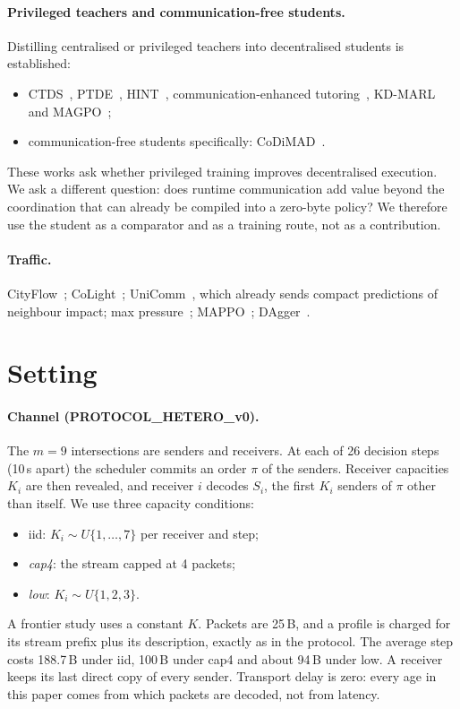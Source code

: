 \documentclass[11pt]{article}
\theoremstyle{definition}
\begin{document}
\paragraph{Privileged teachers and communication-free students.} Distilling centralised or privileged teachers into
decentralised students is established:
\begin{itemize}
\item CTDS~\cite{ctds}, PTDE~\cite{ptde}, HINT~\cite{hint}, communication-enhanced tutoring~\cite{tutoring},
KD-MARL~\cite{kdmarl} and MAGPO~\cite{magpo};
\item communication-free students specifically: CoDiMAD~\cite{codimad}.
\end{itemize}
These works ask whether privileged training improves decentralised execution. We ask a different question: does
runtime communication add value beyond the coordination that can already be compiled into a zero-byte policy? We
therefore use the student as a comparator and as a training route, not as a contribution.
\paragraph{Traffic.} CityFlow~\cite{cityflow}; CoLight~\cite{colight}; UniComm~\cite{unicomm}, which already sends
compact predictions of neighbour impact; max pressure~\cite{varaiya2013}; MAPPO~\cite{mappo}; DAgger~\cite{dagger}.

\section{Setting}\label{sec:setting}
\paragraph{Channel (PROTOCOL\_HETERO\_v0).} The $m=9$ intersections are senders and receivers. At each of 26 decision
steps (10\,s apart) the scheduler commits an order $\pi$ of the senders. Receiver capacities $K_i$ are then revealed,
and receiver $i$ decodes $S_i$, the first $K_i$ senders of $\pi$ other than itself. We use three capacity conditions:
\begin{itemize}
\item iid: $K_i\sim U\{1,\dots,7\}$ per receiver and step;
\item \emph{cap4}: the stream capped at 4 packets;
\item \emph{low}: $K_i\sim U\{1,2,3\}$.
\end{itemize}
A frontier study uses a constant $K$. Packets are 25\,B, and a profile is charged for its stream prefix plus its
description, exactly as in the protocol. The average step costs 188.7\,B under iid, 100\,B under cap4 and about 94\,B
under low. A receiver keeps its last direct copy of every sender. Transport delay is zero: every age in this paper comes
from which packets are decoded, not from latency.
\end{document}
